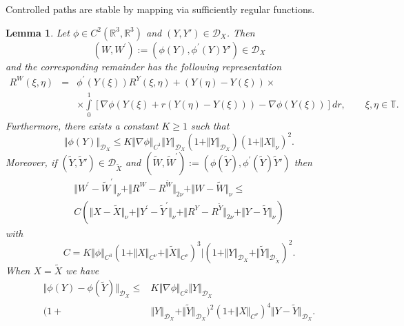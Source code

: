 \documentclass[11pt,a4paper,reqno]{amsart}%
\theoremstyle{plain}
\theoremstyle{remark}
\theoremstyle{plain}
\newtheorem{lemma}[theorem]{Lemma}
\numberwithin{equation}{section}
\def\Rnu{{\mathbb R}}
\def\intl{\int\limits}
\begin{document}
Controlled paths are stable by mapping via sufficiently regular functions. 
\begin{lemma}\label{lem:RegularMap}
Let $\phi\in C^2(\Rnu^3,\Rnu^3)$ and $(Y,Y')\in \mathcal{D}_X$.
Then
\begin{equation}
(W,W^\prime):=(\phi(Y),\phi^\prime(Y)Y')\in
\mathcal{D}_X\label{eqn:RegularMap-1}
\end{equation}
and the corresponding remainder has the following representation
\begin{eqnarray}
R^{W}(\xi,\eta)&=&\phi^\prime(Y(\xi))R^Y(\xi,\eta)+
(Y(\eta)-Y(\xi))\times
\nonumber
\\&& \times\intl_0^1[\nabla\phi(Y(\xi)+r(Y(\eta)-Y(\xi)))-\nabla\phi(Y(\xi))]dr,\qquad\xi,\eta\in
\mathbb{T}.
\label{eqn:RegularMap-2}
\end{eqnarray}
Furthermore, there exists a
constant $K\geq 1$ such that
\begin{equation}
\Vert \phi(Y)\Vert_{\mathcal{D}_X}\leq
K\Vert \nabla\phi\Vert_{C^1}\Vert Y\Vert_{\mathcal{D}_X}(1+\Vert Y\Vert_{\mathcal{D}_X})(1+\Vert X\Vert_{\nu})^2.\label{eqn:RegularMap-3}
\end{equation}
Moreover, if $(\tilde{Y},\tilde{Y}')\in \mathcal{D}_{\tilde{X}}$
and
$
(\tilde{W},\tilde{W}^\prime):=(\phi(\tilde{Y}),\phi^\prime(\tilde{Y})\tilde{Y}')
$
then
\begin{equation}
\begin{split}
\label{eqn:RegularMap-4}
\Vert W^\prime-\tilde{W}^\prime\Vert_{\nu}+\Vert R^W-R^{\tilde{W}}\Vert_{2\nu}+\Vert W-\tilde{W}\Vert_{\nu}\leq\\
C(\Vert X-\tilde{X}\Vert_{\nu}+\Vert Y^\prime-\tilde{Y}^\prime\Vert_{\nu}+\Vert R^Y-R^{\tilde{Y}}\Vert_{2\nu}+\Vert Y-\tilde{Y}\Vert_{\nu})
\end{split}
\end{equation}
with
\begin{equation}
C=K\Vert \phi\Vert_{C^3}(1+\Vert X\Vert_{C^{\nu}}+\Vert \tilde{X}\Vert_{C^{\nu}})^3\vert (1+\Vert Y\Vert_{\mathcal{D}_X}+\Vert \tilde{Y}\Vert_{\mathcal{D}_{\tilde{X}}})^2.\label{eqn:RegularMap-4'}
\end{equation}
When $X=\tilde{X}$ we have
\begin{equation}
\label{eqn:RegularMap-4''}
\begin{split}
\Vert \phi(Y)-\phi(\tilde{Y})\Vert_{\mathcal{D}_X}\leq
& K\Vert \nabla\phi\Vert_{C^2}\Vert Y\Vert_{\mathcal{D}_X}\\
(1+&\Vert Y\Vert_{\mathcal{D}_X}+\Vert \tilde{Y}\Vert_{\mathcal{D}_X})^2(1+\Vert X\Vert_{C^{\nu}})^4
\Vert Y-\tilde{Y}\Vert_{\mathcal{D}_X}.
\end{split}
\end{equation}
\end{lemma}
\end{document}
